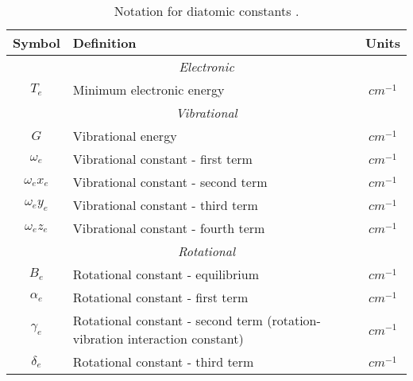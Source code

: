 \documentclass[11pt, twoside, fleqn]{report}
\begin{document}
\begin{table}[H]
    \centering
    \caption{Notation for diatomic constants \cite{herzberg:diatomic,nist:sigma1,nist:sigma3}.}
    \label{t:notation}
    \begin{tabular}{clc}
        \toprule
        Symbol        & Definition                                                                  & Units            \\
        \midrule
        \multicolumn{3}{c}{\textit{Electronic}}                                                                        \\
        \cmidrule(lr){1-3}
        $T_e$         & Minimum electronic energy                                                   & $\unit{cm^{-1}}$ \\
        \multicolumn{3}{c}{\textit{Vibrational}}                                                                       \\
        \cmidrule(lr){1-3}
        $G$           & Vibrational energy                                                          & $\unit{cm^{-1}}$ \\
        $\omega_e$    & Vibrational constant - first term                                           & $\unit{cm^{-1}}$ \\
        $\omega_ex_e$ & Vibrational constant - second term                                          & $\unit{cm^{-1}}$ \\
        $\omega_ey_e$ & Vibrational constant - third term                                           & $\unit{cm^{-1}}$ \\
        $\omega_ez_e$ & Vibrational constant - fourth term                                          & $\unit{cm^{-1}}$ \\
        \multicolumn{3}{c}{\textit{Rotational}}                                                                        \\
        \cmidrule(lr){1-3}
        $B_e$         & Rotational constant - equilibrium                                           & $\unit{cm^{-1}}$ \\
        $\alpha_e$    & Rotational constant - first term                                            & $\unit{cm^{-1}}$ \\
        $\gamma_e$    & Rotational constant - second term (rotation-vibration interaction constant) & $\unit{cm^{-1}}$ \\
        $\delta_e$    & Rotational constant - third term                                            & $\unit{cm^{-1}}$ \\

\end{tabular}
\end{table}
\end{document}
